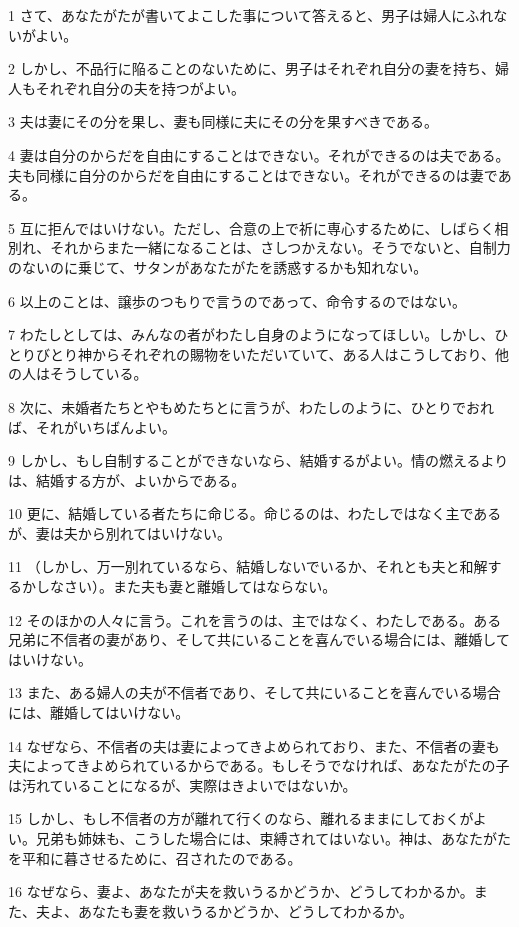 \par 1 さて、あなたがたが書いてよこした事について答えると、男子は婦人にふれないがよい。
\par 2 しかし、不品行に陥ることのないために、男子はそれぞれ自分の妻を持ち、婦人もそれぞれ自分の夫を持つがよい。
\par 3 夫は妻にその分を果し、妻も同様に夫にその分を果すべきである。
\par 4 妻は自分のからだを自由にすることはできない。それができるのは夫である。夫も同様に自分のからだを自由にすることはできない。それができるのは妻である。
\par 5 互に拒んではいけない。ただし、合意の上で祈に専心するために、しばらく相別れ、それからまた一緒になることは、さしつかえない。そうでないと、自制力のないのに乗じて、サタンがあなたがたを誘惑するかも知れない。
\par 6 以上のことは、譲歩のつもりで言うのであって、命令するのではない。
\par 7 わたしとしては、みんなの者がわたし自身のようになってほしい。しかし、ひとりびとり神からそれぞれの賜物をいただいていて、ある人はこうしており、他の人はそうしている。
\par 8 次に、未婚者たちとやもめたちとに言うが、わたしのように、ひとりでおれば、それがいちばんよい。
\par 9 しかし、もし自制することができないなら、結婚するがよい。情の燃えるよりは、結婚する方が、よいからである。
\par 10 更に、結婚している者たちに命じる。命じるのは、わたしではなく主であるが、妻は夫から別れてはいけない。
\par 11 （しかし、万一別れているなら、結婚しないでいるか、それとも夫と和解するかしなさい）。また夫も妻と離婚してはならない。
\par 12 そのほかの人々に言う。これを言うのは、主ではなく、わたしである。ある兄弟に不信者の妻があり、そして共にいることを喜んでいる場合には、離婚してはいけない。
\par 13 また、ある婦人の夫が不信者であり、そして共にいることを喜んでいる場合には、離婚してはいけない。
\par 14 なぜなら、不信者の夫は妻によってきよめられており、また、不信者の妻も夫によってきよめられているからである。もしそうでなければ、あなたがたの子は汚れていることになるが、実際はきよいではないか。
\par 15 しかし、もし不信者の方が離れて行くのなら、離れるままにしておくがよい。兄弟も姉妹も、こうした場合には、束縛されてはいない。神は、あなたがたを平和に暮させるために、召されたのである。
\par 16 なぜなら、妻よ、あなたが夫を救いうるかどうか、どうしてわかるか。また、夫よ、あなたも妻を救いうるかどうか、どうしてわかるか。
